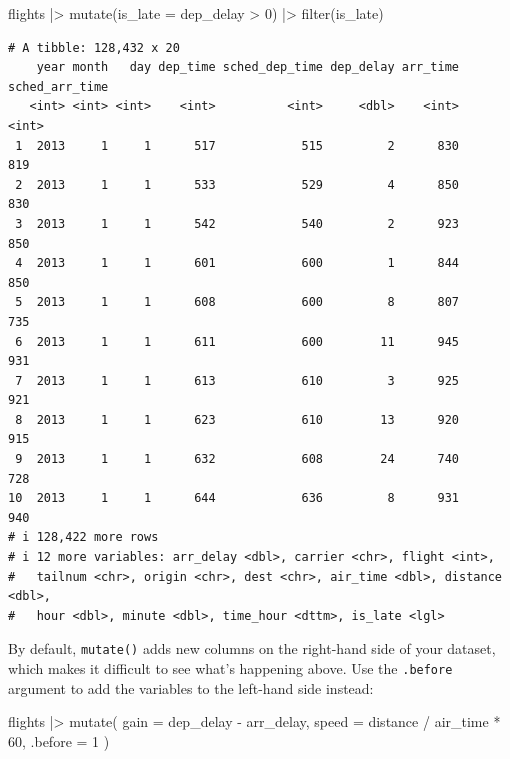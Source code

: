 \documentclass[
  letterpaper,
  DIV=11,
  numbers=noendperiod]{scrreprt}
\newenvironment{Shaded}{\begin{snugshade}}{\end{snugshade}}
\newcommand{\AttributeTok}[1]{\textcolor[rgb]{0.40,0.45,0.13}{#1}}
\newcommand{\DecValTok}[1]{\textcolor[rgb]{0.68,0.00,0.00}{#1}}
\newcommand{\FunctionTok}[1]{\textcolor[rgb]{0.28,0.35,0.67}{#1}}
\newcommand{\NormalTok}[1]{\textcolor[rgb]{0.00,0.23,0.31}{#1}}
\newcommand{\SpecialCharTok}[1]{\textcolor[rgb]{0.37,0.37,0.37}{#1}}
\begin{document}
\begin{Shaded}
\begin{Highlighting}[]
\NormalTok{flights }\SpecialCharTok{|\textgreater{}}
  \FunctionTok{mutate}\NormalTok{(}\AttributeTok{is\_late =}\NormalTok{ dep\_delay }\SpecialCharTok{\textgreater{}} \DecValTok{0}\NormalTok{) }\SpecialCharTok{|\textgreater{}}
  \FunctionTok{filter}\NormalTok{(is\_late)}
\end{Highlighting}
\end{Shaded}

\begin{verbatim}
# A tibble: 128,432 x 20
    year month   day dep_time sched_dep_time dep_delay arr_time sched_arr_time
   <int> <int> <int>    <int>          <int>     <dbl>    <int>          <int>
 1  2013     1     1      517            515         2      830            819
 2  2013     1     1      533            529         4      850            830
 3  2013     1     1      542            540         2      923            850
 4  2013     1     1      601            600         1      844            850
 5  2013     1     1      608            600         8      807            735
 6  2013     1     1      611            600        11      945            931
 7  2013     1     1      613            610         3      925            921
 8  2013     1     1      623            610        13      920            915
 9  2013     1     1      632            608        24      740            728
10  2013     1     1      644            636         8      931            940
# i 128,422 more rows
# i 12 more variables: arr_delay <dbl>, carrier <chr>, flight <int>,
#   tailnum <chr>, origin <chr>, dest <chr>, air_time <dbl>, distance <dbl>,
#   hour <dbl>, minute <dbl>, time_hour <dttm>, is_late <lgl>
\end{verbatim}

By default, \texttt{mutate()} adds new columns on the right-hand side of
your dataset, which makes it difficult to see what's happening above.
Use the \texttt{.before} argument to add the variables to the left-hand
side instead:

\begin{Shaded}
\begin{Highlighting}[]
\NormalTok{flights }\SpecialCharTok{|\textgreater{}}
  \FunctionTok{mutate}\NormalTok{(}
    \AttributeTok{gain =}\NormalTok{ dep\_delay }\SpecialCharTok{{-}}\NormalTok{ arr\_delay,}
    \AttributeTok{speed =}\NormalTok{ distance }\SpecialCharTok{/}\NormalTok{ air\_time }\SpecialCharTok{*} \DecValTok{60}\NormalTok{,}
    \AttributeTok{.before =} \DecValTok{1}
\NormalTok{  )}
\end{Highlighting}
\end{Shaded}
\end{document}

